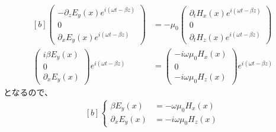 \documentclass[../ap_2013.tex]{subfiles}
\begin{document}
\begin{equation}\begin{aligned}[b]
    \begin{pmatrix}
        -\partial_z E_y(x)e^{i(\omega t-\beta z)}\\
        0\\
        \partial_x E_y(x)e^{i(\omega t-\beta z)}
    \end{pmatrix}
    &=-\mu_0\begin{pmatrix}
        \partial_t H_x(x)e^{i(\omega t-\beta z)}\\
        0\\
        \partial_t H_z(x)e^{i(\omega t-\beta z)}
    \end{pmatrix}\\
    \begin{pmatrix}
        i\beta E_y(x)\\
        0\\
        \partial_x E_y(x)
    \end{pmatrix}e^{i(\omega t-\beta z)}
    &=\begin{pmatrix}
        -i\omega\mu_0 H_x(x)\\
        0\\
        -i\omega\mu_0 H_z(x)
    \end{pmatrix}e^{i(\omega t-\beta z)}
\end{aligned}\end{equation}
となるので、
\begin{equation}\begin{aligned}[b]
    \begin{cases}
        \beta E_y(x) &= -\omega \mu_0H_x(x)\\
        \partial_x E_y(x) &= -i\omega \mu_0H_z(x)
    \end{cases}
\end{aligned}\end{equation}
\end{document}

